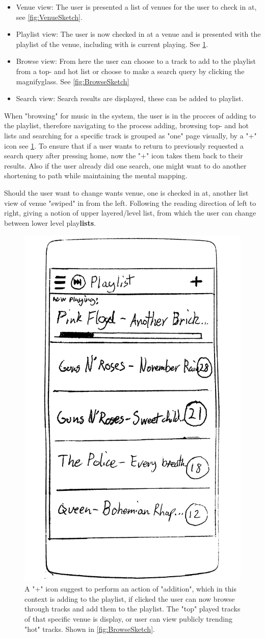 \begin{itemize}
\item Venue view: The user is presented a list of venues for the user to check in at, see \cref{fig:VenueSketch}.
\item Playlist view: The user is now checked in at a venue and is presented with the playlist of the venue, including with is current playing. See \cref{fig:PlaylistSketch}. 
\item Browse view: From here the user can choose to a track to add to the playlist from a top- and hot list or choose to make a search query by clicking the magnifyglass. See \cref{fig:BrowseSketch}
\item Search view: Search results are displayed, these can be added to playlist.
\end{itemize}

When "browsing" for music in the system, the user is in the procces of adding to the playlist, therefore navigating to the process adding, browsing top- and hot lists and searching for a specific track is grouped as "one" page visually, by a "+" icon see \cref{fig:PlaylistSketch}. To ensure that if a user wants to return to previously requested a search query after pressing home, now the "+" icon takes them back to their results. Also if the user already did one search, one might want to do another shortening to path while maintaining the mental mapping.

Should the user want to change wants venue, one is checked in at, another list view of venue "swiped" in from the left. Following the reading direction of left to right, giving a notion of upper layered/level  list, from which the user can change between lower level play\textbf{lists}.


\begin{figure}
  \centering
  \includegraphics[width=0.25\linewidth]{Images/sketch3.png}
  \caption{A "+" icon suggest to perform an action of "addition", which in this context is adding to the playlist, if clicked the user can now browse through tracks and add them to the playlist. The "top" played tracks of that specific venue is display, or user can view publicly trending "hot" tracks. Shown in \cref{fig:BrowseSketch}.}
  \label{fig:PlaylistSketch}
\end{figure}

